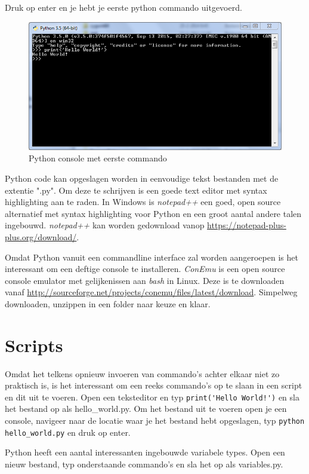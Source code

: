 \documentclass[11pt,twoside]{article}
\begin{document}
Druk op enter en je hebt je eerste python commando uitgevoerd.
\begin{figure}[ht]
	\centering
	\includegraphics[scale=0.5]{Python35_(64-bit)}
	\caption{Python console met eerste commando}
	\label{Python35_(64-bit)}
\end{figure}

Python code kan opgeslagen worden in eenvoudige tekst bestanden met de extentie "\textsf{.py}". Om deze te schrijven is een goede text editor met syntax highlighting aan te raden. In Windows is \emph{notepad++} een goed, open source alternatief met syntax highlighting voor Python en een groot aantal andere talen ingebouwd. \emph{notepad++} kan worden gedownload vanop \url{https://notepad-plus-plus.org/download/}.

Omdat Python vanuit een commandline interface zal worden aangeroepen is het interessant om een deftige console te installeren. \emph{ConEmu} is een open source console emulator met gelijkenissen aan \emph{bash} in Linux. Deze is te downloaden vanaf \url{http://sourceforge.net/projects/conemu/files/latest/download}. Simpelweg downloaden, unzippen in een folder naar keuze en klaar.

 	\section{Scripts}
Omdat het telkens opnieuw invoeren van commando's achter elkaar niet zo praktisch is, is het interessant om een reeks commando's op te slaan in een script en dit uit te voeren. Open een teksteditor en typ \lstinline{print('Hello World!')} en sla het bestand op als \textsf{hello\_world.py}. Om het bestand uit te voeren open je een console, navigeer naar de locatie waar je het bestand hebt opgeslagen, typ \lstinline[language=bash]{python hello_world.py} en druk op enter.

Python heeft een aantal interessanten ingebouwde variabele types. Open een nieuw bestand, typ onderstaande commando's en sla het op als \textsf{variables.py}.

\end{document}
